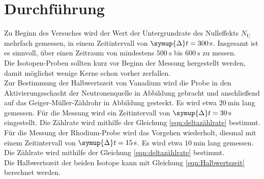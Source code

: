 \section{Durchführung} \label{sec:durchfuehrung}

Zu Beginn des Versuches wird der Wert der Untergrundrate des Nulleffekts $N_\text{U}$ mehrfach gemessen,
in einem Zeitintervall von $\symup{\Delta}t = \SI{300}{\second}$.
Insgesamt ist es sinnvoll, 
über einen Zeitraum von mindestens $\SI{500}{\second}$ bis $\SI{600}{\second}$ zu messen.\\
Die Isotopen-Proben sollten kurz vor Beginn der Messung hergestellt werden,
damit möglichst wenige Kerne schon vorher zerfallen.\\
Zur Bestimmung der Halbwertszeit von Vanadium wird die Probe in den Aktivierungsschacht der Neutronenquelle in Abbildung 
gebracht und anschließend auf das Geiger-Müller-Zählrohr in Abbildung %
gesteckt.
Es wird etwa $\SI{20}{\minute}$ lang gemessen. %
Für die Messung wird ein Zeitintervall von $\symup{\Delta}t = \SI{30}{\second}$ eingestellt.
Die Zählrate wird mithilfe der Gleichung \eqref{eqn:deltazählrate} bestimmt.\\
Für die Messung der Rhodium-Probe wird das Vorgehen wiederholt,
diesmal mit einem Zeitintervall von $\symup{\Delta}t = \SI{15}{\second}$.
Es wird etwa $\SI{10}{\minute}$ lang gemessen. %
Die Zählrate wird mithilfe der Gleichung \eqref{eqn:deltazählrate} bestimmt.\\
Die Halbwertszeit der beiden Isotope kann mit Gleichung \eqref{eqn:Halbwertszeit} berechnet werden.